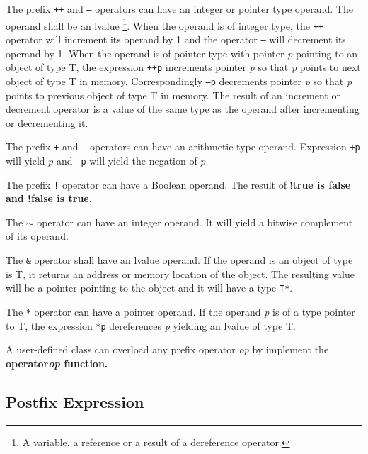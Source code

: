 \documentclass[a4paper,oneside,11pt]{article}
\begin{document}
The prefix \texttt{++} and \texttt{--} operators can have an integer or pointer type operand.
The operand shall be an lvalue \footnote{A variable, a reference or a result of a dereference operator.}.
When the operand is of integer type, the \texttt{++} operator will increment its operand by 1 and the operator \texttt{--} will decrement its operand by 1.
When the operand is of pointer type with pointer \emph{p} pointing to an object of type T,
the expression \texttt{++p} increments pointer \emph{p} so that \emph{p} points to next object of type T in memory.
Correspondingly \texttt{--p} decrements pointer \emph{p} so that \emph{p} points to previous object of type T in memory.
The result of an increment or decrement operator is a value of the same type as the operand after incrementing or decrementing it.

The prefix \texttt{+} and \texttt{-} operators can have an arithmetic type operand.
Expression \texttt{+p} will yield $p$ and \texttt{-p} will yield the negation of $p$.

The prefix \texttt{!} operator can have a Boolean operand. The result of !\bf{true} is \bf{false} and !\bf{false} is \bf{true}.

The $\sim$ operator can have an integer operand. It will yield a bitwise complement of its operand.

The \texttt{\&} operator shall have an lvalue operand.
If the operand is an object of type is T, it returns an address or memory location of the object.
The resulting value will be a pointer pointing to the object and it will have a type \texttt{T*}.

The \texttt{*} operator can have a pointer operand. If the operand \emph{p} is of a type pointer to T,
the expression \texttt{*p} dereferences \emph{p} yielding an lvalue of type T.

A user-defined class can overload any prefix operator \emph{op} by implement the \bf{operator\emph{op}} function.

\subsection{Postfix Expression}\label{postfix}\label{expressionlist}\label{argumentlist}
\end{document}
